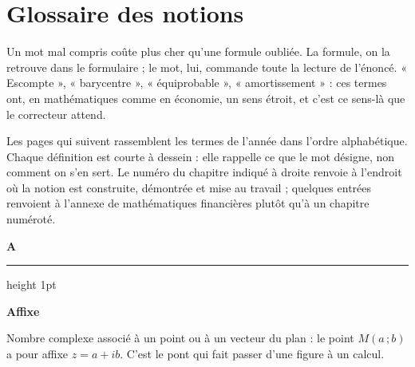 \chapter{Glossaire des notions}

Un mot mal compris coûte plus cher qu'une formule oubliée. La formule, on la
retrouve dans le formulaire ; le mot, lui, commande toute la lecture de
l'énoncé. « Escompte », « barycentre », « équiprobable », « amortissement » :
ces termes ont, en mathématiques comme en économie, un sens étroit, et c'est
ce sens-là que le correcteur attend.

Les pages qui suivent rassemblent les termes de l'année dans l'ordre
alphabétique. Chaque définition est courte à dessein : elle rappelle ce que
le mot désigne, non comment on s'en sert. Le numéro du chapitre indiqué à
droite renvoie à l'endroit où la notion est construite, démontrée et mise au
travail ; quelques entrées renvoient à l'annexe de mathématiques financières
plutôt qu'à un chapitre numéroté.

\newcommand{\glolettre}[1]{%
  \par\vspace{1.15em}\noindent
  \begingroup\sffamily\bfseries\large\color{bmtAccent}#1\endgroup
  \hspace{0.5em}%
  {\color{bmtGrisClair}\leaders\hrule height 1pt\hfill\kern0pt}%
  \par\vspace{0.35em}}

\newcommand{\glo}[2]{%
  \par\vspace{0.5em}\noindent
  {\sffamily\bfseries\small\color{bmtAccent}#1}%
  \hspace{0.45em}{\sffamily\footnotesize\color{bmtGris}ch.~#2}%
  \par\vspace{0.05em}\noindent\ignorespaces}

\glolettre{A}

\glo{Affixe}{9}
Nombre complexe associé à un point ou à un vecteur du plan : le point
$M(a\,;b)$ a pour affixe $z = a+ib$. C'est le pont qui fait passer d'une
figure à un calcul.

